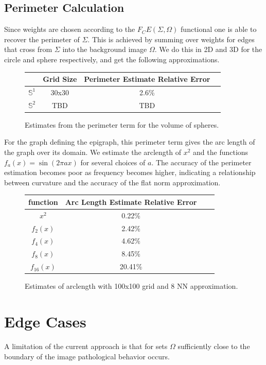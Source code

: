 \documentclass[12pt]{article}
\begin{document}
\subsection{Perimeter Calculation}

Since weights are chosen according to the $F_CE(\Sigma,\Omega)$ functional one is able to recover the perimeter of $\Sigma$. This is achieved by summing over weights for edges that cross from $\Sigma$ into the background image $\Omega$. We do this in 2D and 3D for the circle and sphere respectively, and get the following approximations.

\begin{figure}[H]
	\centering
	\begin{tabular}{|c|c|c|c|}
		\hline
		&  Grid Size & Perimeter Estimate Relative Error  \\
		\hline
		$\mathbb{S}^1$ & 30x30 &  2.6\%  \\
		\hline
		$\mathbb{S}^2$ & TBD & TBD    \\
		\hline
	\end{tabular}
	\caption{Estimates from the perimeter term for the volume of spheres.}
\end{figure}

For the graph defining the epigraph, this perimeter term gives the arc length of the graph over its domain. We estimate the arclength of $x^2$ and the functions $f_a(x) = \sin(2\pi ax)$ for several choices of $a$. The accuracy of the perimeter estimation becomes poor as frequency becomes higher, indicating a relationship between curvature and the accuracy of the flat norm approximation.

\begin{figure}[H]
	\centering
	\begin{tabular}{|c|c|c|c|}
		\hline
		function & Arc Length Estimate Relative Error  \\
		\hline
		$x^2$   &  0.22\%  \\
		\hline
		$f_{2}(x)$  & 2.42\%    \\
		\hline
		$f_{4}(x)$  & 4.62\%    \\
		\hline
		$f_{8}(x)$  & 8.45\%    \\
		\hline
		$f_{16}(x)$  & 20.41\%    \\
		\hline
	\end{tabular}
	\caption{Estimates of arclength with 100x100 grid and 8 NN approximation.}
\end{figure}

\section{Edge Cases}

A limitation of the current approach is that for sets $\Omega$ sufficiently close to the boundary of the image pathological behavior occurs.



\end{document}
